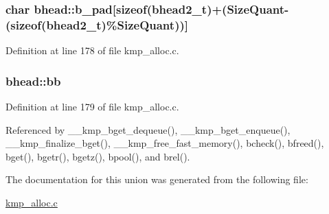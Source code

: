 \hypertarget{unionbhead_aad3bcf2ab7e479e8e8c918f4659ba445}{
\subsubsection[{b\-\_\-pad}]{\setlength{\rightskip}{0pt plus 5cm}char bhead\-::b\-\_\-pad\mbox{[}sizeof({\bf bhead2\-\_\-t})+({\bf Size\-Quant}-\/(sizeof({\bf bhead2\-\_\-t})\%{\bf Size\-Quant}))\mbox{]}}}\label{unionbhead_aad3bcf2ab7e479e8e8c918f4659ba445}


Definition at line 178 of file kmp\-\_\-alloc.\-c.

\hypertarget{unionbhead_ab99fcbcc7514c17564d6e3fca349903a}{
\subsubsection[{bb}]{ bhead\-::bb}}\label{unionbhead_ab99fcbcc7514c17564d6e3fca349903a}


Definition at line 179 of file kmp\-\_\-alloc.\-c.



Referenced by \-\_\-\-\_\-kmp\-\_\-bget\-\_\-dequeue(), \-\_\-\-\_\-kmp\-\_\-bget\-\_\-enqueue(), \-\_\-\-\_\-kmp\-\_\-finalize\-\_\-bget(), \-\_\-\-\_\-kmp\-\_\-free\-\_\-fast\-\_\-memory(), bcheck(), bfreed(), bget(), bgetr(), bgetz(), bpool(), and brel().



The documentation for this union was generated from the following file\-:\begin{DoxyCompactItemize}
\item 
\hyperlink{kmp__alloc_8c}{kmp\-\_\-alloc.\-c}\end{DoxyCompactItemize}
